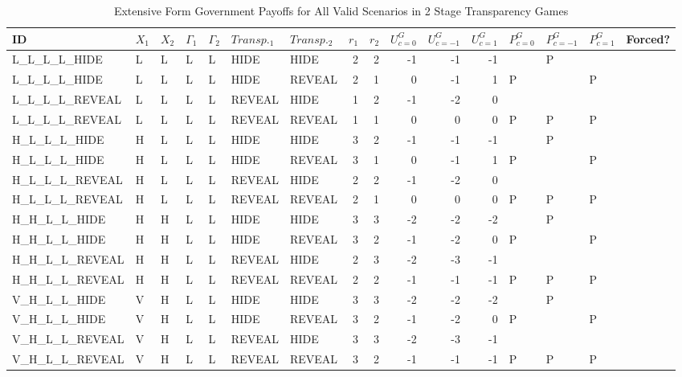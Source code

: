 \begingroup\tiny
\begin{longtable}{lllllllrrrrrllll}
\caption{Extensive Form Government Payoffs for All Valid Scenarios in 2 Stage Transparency Games} \\ 
  \hline
ID & $X_{1}$ & $X_{2}$ & $\Gamma_{1}$ & $\Gamma_{2}$ & $Transp._{1}$ & $Transp._{2}$ & $r_{1}$ & $r_{2}$ & $U^{G}_{c = 0}$ & $U^{G}_{c = -1}$ & $U^{G}_{c = 1}$ & $P^{G}_{c=0}$ & $P^{G}_{c = -1}$ & $P^{G}_{c = 1}$ & Forced? \\ 
  \hline
L\_L\_L\_L\_HIDE & L & L & L & L & HIDE & HIDE & 2 & 2 & -1 & -1 & -1 &  & P &  &  \\ 
  L\_L\_L\_L\_HIDE & L & L & L & L & HIDE & REVEAL & 2 & 1 & 0 & -1 & 1 & P &  & P &  \\ 
  L\_L\_L\_L\_REVEAL & L & L & L & L & REVEAL & HIDE & 1 & 2 & -1 & -2 & 0 &  &  &  &  \\ 
  L\_L\_L\_L\_REVEAL & L & L & L & L & REVEAL & REVEAL & 1 & 1 & 0 & 0 & 0 & P & P & P &  \\ 
  H\_L\_L\_L\_HIDE & H & L & L & L & HIDE & HIDE & 3 & 2 & -1 & -1 & -1 &  & P &  &  \\ 
  H\_L\_L\_L\_HIDE & H & L & L & L & HIDE & REVEAL & 3 & 1 & 0 & -1 & 1 & P &  & P &  \\ 
  H\_L\_L\_L\_REVEAL & H & L & L & L & REVEAL & HIDE & 2 & 2 & -1 & -2 & 0 &  &  &  &  \\ 
  H\_L\_L\_L\_REVEAL & H & L & L & L & REVEAL & REVEAL & 2 & 1 & 0 & 0 & 0 & P & P & P &  \\ 
  H\_H\_L\_L\_HIDE & H & H & L & L & HIDE & HIDE & 3 & 3 & -2 & -2 & -2 &  & P &  &  \\ 
  H\_H\_L\_L\_HIDE & H & H & L & L & HIDE & REVEAL & 3 & 2 & -1 & -2 & 0 & P &  & P &  \\ 
  H\_H\_L\_L\_REVEAL & H & H & L & L & REVEAL & HIDE & 2 & 3 & -2 & -3 & -1 &  &  &  &  \\ 
  H\_H\_L\_L\_REVEAL & H & H & L & L & REVEAL & REVEAL & 2 & 2 & -1 & -1 & -1 & P & P & P &  \\ 
  V\_H\_L\_L\_HIDE & V & H & L & L & HIDE & HIDE & 3 & 3 & -2 & -2 & -2 &  & P &  &  \\ 
  V\_H\_L\_L\_HIDE & V & H & L & L & HIDE & REVEAL & 3 & 2 & -1 & -2 & 0 & P &  & P &  \\ 
  V\_H\_L\_L\_REVEAL & V & H & L & L & REVEAL & HIDE & 3 & 3 & -2 & -3 & -1 &  &  &  &  \\ 
  V\_H\_L\_L\_REVEAL & V & H & L & L & REVEAL & REVEAL & 3 & 2 & -1 & -1 & -1 & P & P & P &  \\ 

\end{longtable}
